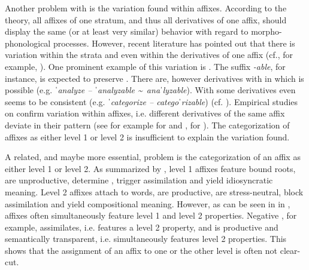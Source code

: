 Another problem with  is the variation found within affixes. According to the theory, all affixes of one stratum, and thus all derivatives of one affix, should display the same (or at least very similar) behavior with regard to morpho-phonological processes. However, recent literature has pointed out that there is variation within the strata and even within the derivatives of one affix (cf., for example, \citealt{Raffelsiefen.1999,Bauer.2013, Plag.2014, BermudezOtero.2017}).  One prominent example of this variation is . The suffix \textit{-able}, for instance, is expected to preserve . There are, however derivatives with  in which  is possible (e.g. \textit{ˈanalyze -- ˈanalyzable \textasciitilde\ anaˈlyzable}). With some derivatives  even seems to  be consistent (e.g. \textit{ˈcategorize -- categoˈrizable}) (cf. \citealt[213f.]{Plag.2014}). Empirical studies on  confirm variation within affixes, i.e. different derivatives of the same affix deviate in their  pattern (see for example \citealt{Collie.2008} for  and , \citealt{Sanz.2017} for ). The categorization of affixes as either level 1 or level 2 is insufficient to explain the variation found. 

A related, and maybe more essential, problem is the categorization of an affix as either level 1 or level 2. As summarized by \citet[134]{Raffelsiefen.1999}, level 1 affixes feature bound roots, are unproductive, determine , trigger assimilation and yield idiosyncratic meaning. Level 2 affixes attach to words, are productive, are stress-neutral, block assimilation and yield compositional meaning. However, as can be seen in  in , affixes often simultaneously feature level 1 and level 2 properties. Negative , for example, assimilates, i.e. features a level 2 property, and is productive and semantically transparent, i.e. simultaneously features level 2 properties. This shows that the assignment of an affix to one or the other level is often not clear-cut. 


